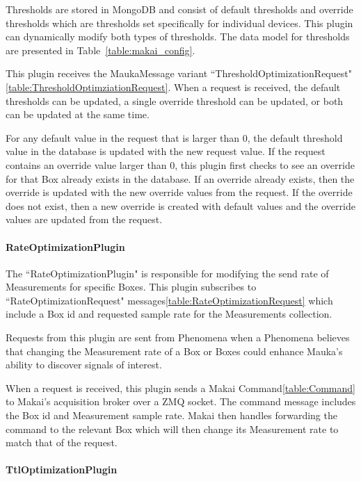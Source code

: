 Thresholds are stored in MongoDB and consist of default thresholds and override thresholds which are thresholds set specifically for individual devices. This plugin can dynamically modify both types of thresholds. The data model for thresholds are presented in Table~\ref{table:makai_config}.

This plugin receives the MaukaMessage variant ``ThresholdOptimizationRequest"\ref{table:ThresholdOptimziationRequest}. When a request is received, the default thresholds can be updated, a single override threshold can be updated, or both can be updated at the same time.

For any default value in the request that is larger than 0, the default threshold value in the database is updated with the new request value. If the request contains an override value larger than 0, this plugin first checks to see an override for that Box already exists in the database. If an override already exists, then the override is updated with the new override values from the request. If the override does not exist, then a new override is created with default values and the override values are updated from the request.

\paragraph{RateOptimizationPlugin}

The ``RateOptimizationPlugin" is responsible for modifying the send rate of Measurements for specific Boxes. This plugin subscribes to ``RateOptimizationRequest" messages\ref{table:RateOptimizationRequest} which include a Box id and requested sample rate for the Measurements collection.

Requests from this plugin are sent from Phenomena when a Phenomena believes that changing the Measurement rate of a Box or Boxes could enhance Mauka's ability to discover signals of interest.

When a request is received, this plugin sends a Makai Command\ref{table:Command} to Makai's acquisition broker over a ZMQ socket. The command message includes the Box id and Measurement sample rate. Makai then handles forwarding the command to the relevant Box which will then change its Measurement rate to match that of the request.

\paragraph{TtlOptimizationPlugin}\label{subsubsec:ttl-optimization-pugin}

